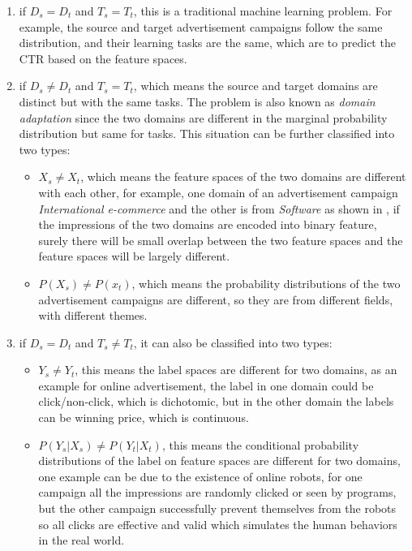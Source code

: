 \documentclass{sig-alternate}
\begin{document}
\begin{enumerate}
\item if \(D_s = D_t\) and \(T_s = T_t\), this is a traditional machine learning problem. For example, the source and target advertisement campaigns follow the same distribution, and their learning tasks are the same, which are to predict the CTR based on the feature spaces. 

\item if  \(D_s \neq D_t\) and \(T_s = T_t\), which means the source and target domains are distinct but with the same tasks. The problem is also known as \textit{domain adaptation} \cite{arnold2007comparative} since the two domains are different in the marginal probability distribution but same for tasks. This situation can be further classified into two types:
    \begin{itemize}
    \item  \(X_s \neq X_t\), which means the feature spaces of the two domains are different with each other, for example, one domain of an advertisement campaign  \textit{International e-commerce} and the other is from \textit{ Software} as shown in \cite{zhang2014real}, if the impressions of the two domains are encoded into binary feature, surely there will be small overlap between the two feature spaces and the feature spaces will be largely different.
    \item \(P(X_s) \neq P(x_t) \), which means the probability distributions of the two advertisement campaigns are different, so they are from different fields, with different themes. 
    
    \end{itemize}
\item if  \(D_s = D_t\) and \(T_s \neq T_t\), it can also be classified into two types:
     \begin{itemize}
    \item  \(Y_s \neq Y_t\), this means the label spaces are different for two domains, as an example for online advertisement, the label in one domain could be click/non-click, which is dichotomic, but in the other domain the labels can be winning price, which is continuous.
    \item \(P(Y_s|X_s) \neq P(Y_t|X_t) \), this means the conditional probability distributions of the label on feature spaces are different for two domains, one example can be due to the existence of online robots, for one campaign all the impressions are randomly clicked or seen by programs, but the other campaign successfully prevent themselves from the robots so all clicks are effective and valid which simulates the human behaviors in the real world.  
  \end{itemize}
\end{enumerate}
\end{document}
